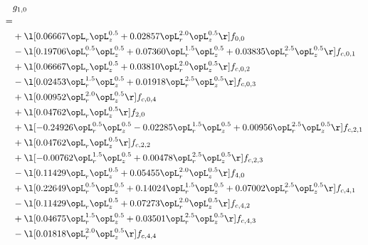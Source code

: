\begin{alignat}{2} 
\label{eq:g_10_0} 
& g_{1,0} \nonumber \\ 
 = \\ 
& + \l[  0.06667 \opL_r \opL_z^{0.5} +  0.02857 \opL_r^{2.0} \opL_z^{0.5}  \r] f_{0,0} \nonumber \\ 
& - \l[  0.19706 \opL_r^{0.5} \opL_z^{0.5} +  0.07360 \opL_r^{1.5} \opL_z^{0.5} +  0.03835 \opL_r^{2.5} \opL_z^{0.5}  \r] f_{c,0,1} \nonumber \\ 
& + \l[  0.06667 \opL_r \opL_z^{0.5} +  0.03810 \opL_r^{2.0} \opL_z^{0.5}  \r] f_{c,0,2} \nonumber \\ 
& - \l[  0.02453 \opL_r^{1.5} \opL_z^{0.5} +  0.01918 \opL_r^{2.5} \opL_z^{0.5}  \r] f_{c,0,3} \nonumber \\ 
& + \l[  0.00952 \opL_r^{2.0} \opL_z^{0.5}  \r] f_{c,0,4} \nonumber \\ 
& + \l[  0.04762 \opL_r \opL_z^{0.5}  \r] f_{2,0} \nonumber \\ 
& + \l[  -0.24926 \opL_r^{0.5} \opL_z^{0.5}   -0.02285 \opL_r^{1.5} \opL_z^{0.5} +  0.00956 \opL_r^{2.5} \opL_z^{0.5}  \r] f_{c,2,1} \nonumber \\ 
& + \l[  0.04762 \opL_r \opL_z^{0.5}  \r] f_{c,2,2} \nonumber \\ 
& + \l[  -0.00762 \opL_r^{1.5} \opL_z^{0.5} +  0.00478 \opL_r^{2.5} \opL_z^{0.5}  \r] f_{c,2,3} \nonumber \\ 
& - \l[  0.11429 \opL_r \opL_z^{0.5} +  0.05455 \opL_r^{2.0} \opL_z^{0.5}  \r] f_{4,0} \nonumber \\ 
& + \l[  0.22649 \opL_r^{0.5} \opL_z^{0.5} +  0.14024 \opL_r^{1.5} \opL_z^{0.5} +  0.07002 \opL_r^{2.5} \opL_z^{0.5}  \r] f_{c,4,1} \nonumber \\ 
& - \l[  0.11429 \opL_r \opL_z^{0.5} +  0.07273 \opL_r^{2.0} \opL_z^{0.5}  \r] f_{c,4,2} \nonumber \\ 
& + \l[  0.04675 \opL_r^{1.5} \opL_z^{0.5} +  0.03501 \opL_r^{2.5} \opL_z^{0.5}  \r] f_{c,4,3} \nonumber \\ 
& - \l[  0.01818 \opL_r^{2.0} \opL_z^{0.5}  \r] f_{c,4,4} \nonumber \\ 
\end{alignat} 


